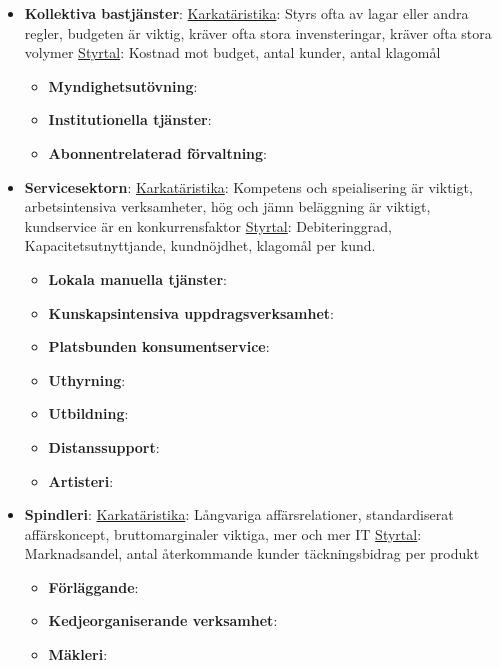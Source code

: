 \begin{itemize}
\begin{itemize}
    \end{itemize}
    \item \textbf{Kollektiva bastjänster}:
    \underline{Karkatäristika}: \newline
    Styrs ofta av lagar eller andra regler, budgeten är viktig, kräver ofta stora invensteringar, kräver ofta stora volymer \newline
    \underline{Styrtal}: \newline
    Kostnad mot budget, antal kunder, antal klagomål
    \begin{itemize}
        \item \textbf{Myndighetsutövning}:
        \item \textbf{Institutionella tjänster}:
        \item \textbf{Abonnentrelaterad förvaltning}:
    \end{itemize}
    \item \textbf{Servicesektorn}:
    \underline{Karkatäristika}: \newline
    Kompetens och speialisering är viktigt, arbetsintensiva verksamheter, hög och jämn beläggning är viktigt, kundservice är en konkurrensfaktor \newline
    \underline{Styrtal}: \newline
    Debiteringgrad, Kapacitetsutnyttjande, kundnöjdhet, klagomål per kund.
    \begin{itemize}
        \item \textbf{Lokala manuella tjänster}:
        \item \textbf{Kunskapsintensiva uppdragsverksamhet}:
        \item \textbf{Platsbunden konsumentservice}:
        \item \textbf{Uthyrning}:
        \item \textbf{Utbildning}:
        \item \textbf{Distanssupport}:
        \item \textbf{Artisteri}:
    \end{itemize}
    \item \textbf{Spindleri}:
    \underline{Karkatäristika}: \newline
    Långvariga affärsrelationer, standardiserat affärskoncept, bruttomarginaler viktiga, mer och mer IT \newline
    \underline{Styrtal}: \newline
    Marknadsandel, antal återkommande kunder täckningsbidrag per produkt
    \begin{itemize}
        \item \textbf{Förläggande}:
        \item \textbf{Kedjeorganiserande verksamhet}:
        \item \textbf{Mäkleri}:
    \end{itemize}
\end{itemize}

